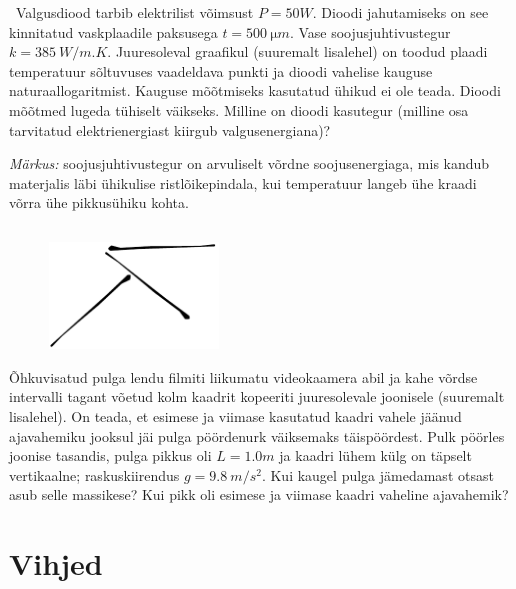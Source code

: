 \documentclass[10pt]{article}
\begin{document}
\
Valgusdiood tarbib elektrilist võimsust $P=\SI{50}W$. Dioodi jahutamiseks on see kinnitatud vaskplaadile paksusega $t=\SI{500}{\micro m}$. Vase soojusjuhtivustegur $k=\SI{385}{W/m.K}$. Juuresoleval graafikul (suuremalt lisalehel) on toodud plaadi temperatuur sõltuvuses vaadeldava punkti ja dioodi vahelise kauguse naturaallogaritmist. Kauguse mõõtmiseks kasutatud ühikud ei ole teada. Dioodi mõõtmed lugeda tühiselt väikseks. Milline on dioodi kasutegur (milline osa tarvitatud elektrienergiast kiirgub valgusenergiana)?

\textit{Märkus:} soojusjuhtivustegur on arvuliselt võrdne soojusenergiaga, mis kandub materjalis läbi ühikulise ristlõikepindala, kui temperatuur langeb ühe kraadi võrra ühe pikkusühiku kohta.
\probend
\bigskip
\newpage\subsection{\protect{}}


\begin{figure}
	\vspace{-15pt}
	\begin{center}
		\includegraphics[width = 0.4\textwidth]{2018-lahg-10-yl.pdf}
	\end{center}
\end{figure}

Õhkuvisatud pulga lendu filmiti liikumatu videokaamera abil ja kahe võrdse intervalli tagant võetud kolm kaadrit kopeeriti juuresolevale joonisele (suuremalt lisalehel). On teada, et esimese ja viimase kasutatud kaadri vahele jäänud ajavahemiku jooksul jäi pulga pöördenurk väiksemaks täispöördest. Pulk pöörles joonise tasandis, pulga pikkus oli $L=\SI{1.0}m$ ja kaadri lühem külg on täpselt vertikaalne; raskuskiirendus $g=\SI{9.8}{m/s^2}$. Kui kaugel pulga jämedamast otsast asub selle massikese? Kui pikk oli esimese ja viimase kaadri vaheline ajavahemik?
\probend
\bigskip
\newpage\normalsize\section{Vihjed}
        \toggleHint
        
\end{document}
